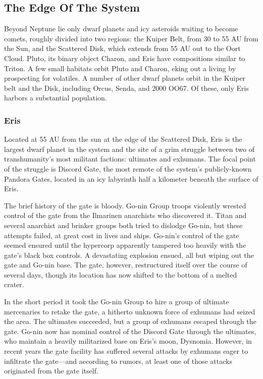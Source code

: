 \subsection{The Edge Of The System}

Beyond Neptune lie only dwarf planets and icy asteroids
waiting to become comets, roughly divided into
two regions: the Kuiper Belt, from 30 to 55 AU from 
the Sun, and the Scattered Disk, which extends from 
55 AU out to the Oort Cloud. Pluto, its binary object 
Charon, and Eris have compositions similar to Triton. 
A few small habitats orbit Pluto and Charon, eking 
out a living by prospecting for volatiles. A number of 
other dwarf planets orbit in the Kuiper belt and the 
Disk, including Orcus, Senda, and 2000 OO67. Of 
these, only Eris harbors a substantial population.

\subsubsection{Eris}

Located at 55 AU from the sun at the edge of the 
Scattered Disk, Eris is the largest dwarf planet in the 
system and the site of a grim struggle between two of 
transhumanity's most militant factions: ultimates and 
exhumans. The focal point of the struggle is Discord 
Gate, the most remote of the system's publicly-known 
Pandora Gates, located in an icy labyrinth half a kilometer
beneath the surface of Eris.

The brief history of the gate is bloody. Go-nin 
Group troops violently wrested control of the gate 
from the Ilmarinen anarchists who discovered it. Titan 
and several anarchist and brinker groups both tried 
to dislodge Go-nin, but these attempts failed, at great 
cost in lives and ships. Go-nin's control of the gate 
seemed ensured until the hypercorp apparently tampered
too heavily with the gate's black box controls.
A devastating explosion ensued, all but wiping out the 
gate and Go-nin base. The gate, however, restructured 
itself over the course of several days, though its location
has now shifted to the bottom of a melted crater.

In the short period it took the Go-nin Group to hire 
a group of ultimate mercenaries to retake the gate, a 
hitherto unknown force of exhumans had seized the 
area. The ultimates succeeded, but a group of exhumans 
escaped through the gate. Go-nin now has nominal 
control of the Discord Gate through the ultimates, who 
maintain a heavily militarized base on Eris's moon, 
Dysnomia. However, in recent years the gate facility has 
suffered several attacks by exhumans eager to infiltrate 
the gate—and according to rumors, at least one of those 
attacks originated from the gate itself.


